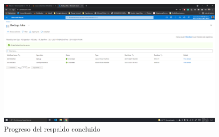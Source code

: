 \documentclass[11pt]{article}
\begin{document}
		\begin{figure}[H]
			\centering
			\includegraphics[scale=0.34]{resources/2.6.2.png}
			\caption{Progreso del respaldo concluido}\label{fig:picture}
		\end{figure}
\end{document}
